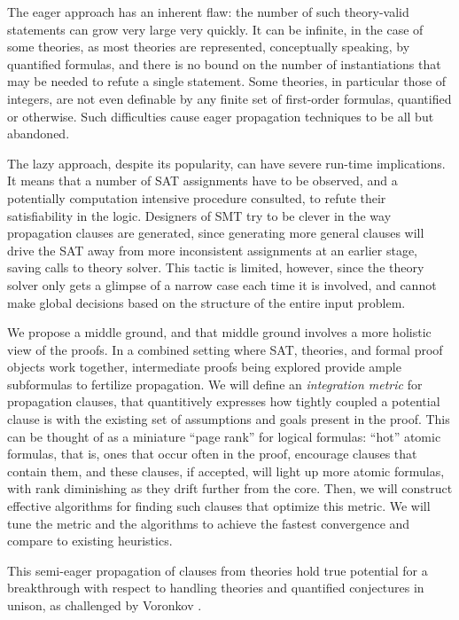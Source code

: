 The eager approach has an inherent flaw: the number of such theory-valid
statements can grow very large very quickly.
It can be infinite, in the case of some theories, as most theories are
represented, conceptually speaking, by quantified formulas, and there is no
bound on the number of instantiations that may be needed to refute a single
statement.
Some theories, in particular those of integers, are not even definable by any
finite set of first-order formulas, quantified or otherwise.
Such difficulties cause eager propagation techniques to be all but abandoned.

The lazy approach, despite its popularity, can have severe run-time
implications.
It means that a number of SAT assignments have to be observed, and a
potentially computation intensive procedure consulted, to refute their
satisfiability in the logic.
Designers of SMT try to be clever in the way propagation clauses are generated,
since generating more general clauses will drive the SAT away from more
inconsistent assignments at an earlier stage, saving calls to theory solver.
This tactic is limited, however, since the theory solver only gets a glimpse
of a narrow case each time it is involved, and cannot make global decisions
based on the structure of the entire input problem.

We propose a middle ground, and that middle ground involves a more holistic view of the proofs.
In a combined setting where SAT, theories, and formal proof objects work
together, intermediate proofs being explored provide ample subformulas to
fertilize propagation.
We will define an \emph{integration metric} for propagation clauses, that
quantitively expresses how tightly coupled a potential clause is with the
existing set of assumptions and goals present in the proof.
This can be thought of as a miniature ``page rank'' for logical formulas:
``hot'' atomic formulas, that is, ones that occur often in the proof, encourage
clauses that contain them, and these clauses, if accepted, will light up
more atomic formulas, with rank diminishing as they drift further from the
core.
Then, we will construct effective algorithms for finding such clauses that
optimize this metric.
We will tune the metric and the algorithms to achieve the fastest convergence
and compare to existing heuristics.

This semi-eager propagation of clauses from theories hold true potential for
a breakthrough with respect to handling theories and quantified conjectures
in unison, as challenged by Voronkov \citeneeded{}.


